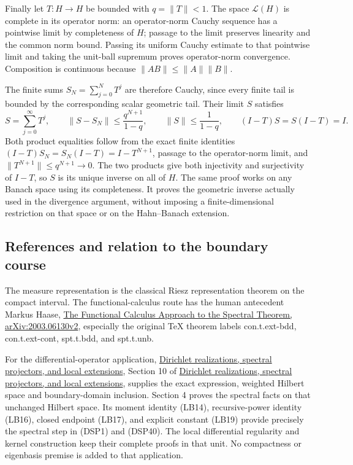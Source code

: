 \documentclass[
  11pt,
]{article}
\begin{document}
Finally let \(T:H\to H\) be bounded with \(q=\|T\|<1\). The space
\(\mathcal L(H)\) is complete in its operator norm: an operator-norm
Cauchy sequence has a pointwise limit by completeness of \(H\); passage
to the limit preserves linearity and the common norm bound. Passing its
uniform Cauchy estimate to that pointwise limit and taking the unit-ball
supremum proves operator-norm convergence. Composition is continuous
because \(\|AB\|\leq\|A\|\|B\|\).

The finite sums \(S_N=\sum_{j=0}^{N}T^j\) are therefore Cauchy, since
every finite tail is bounded by the corresponding scalar geometric tail.
Their limit \(S\) satisfies \[
 S=\sum_{j=0}^{\infty}T^j,\qquad
 \|S-S_N\|\leq\frac{q^{N+1}}{1-q},\qquad
 \|S\|\leq\frac{1}{1-q},\qquad
 (I-T)S=S(I-T)=I.
 \tag{HF23}
\] Both product equalities follow from the exact finite identities
\((I-T)S_N=S_N(I-T)=I-T^{N+1}\), passage to the operator-norm limit, and
\(\|T^{N+1}\|\leq q^{N+1}\to0\). The two products give both injectivity
and surjectivity of \(I-T\), so \(S\) is its unique inverse on all of
\(H\). The same proof works on any Banach space using its completeness.
It proves the geometric inverse actually used in the divergence
argument, without imposing a finite-dimensional restriction on that
space or on the Hahn--Banach extension.

\subsection{References and relation to the boundary
course}\label{references-and-relation-to-the-boundary-course}

The measure representation is the classical Riesz representation theorem
on the compact interval. The functional-calculus route has the human
antecedent Markus Haase, \href{https://arxiv.org/abs/2003.06130v2}{The
Functional Calculus Approach to the Spectral Theorem,
arXiv:2003.06130v2}, especially the original TeX theorem labels
con.t.ext-bdd, con.t.ext-cont, spt.t.bdd, and spt.t.unb.

For the differential-operator application,
\href{dirichlet-spectral-projectors.pdf}{Dirichlet realizations, spectral
projectors, and local extensions}, Section 10 of
\href{dirichlet-spectral-projectors.pdf}{Dirichlet realizations, spectral
projectors, and local extensions}, supplies the exact expression,
weighted Hilbert space and boundary-domain inclusion. Section 4 proves
the spectral facts on that unchanged Hilbert space. Its moment identity
(LB14), recursive-power identity (LB16), closed endpoint (LB17), and
explicit constant (LB19) provide precisely the spectral step in (DSP1)
and (DSP40). The local differential regularity and kernel construction
keep their complete proofs in that unit. No compactness or eigenbasis
premise is added to that application.
\end{document}
